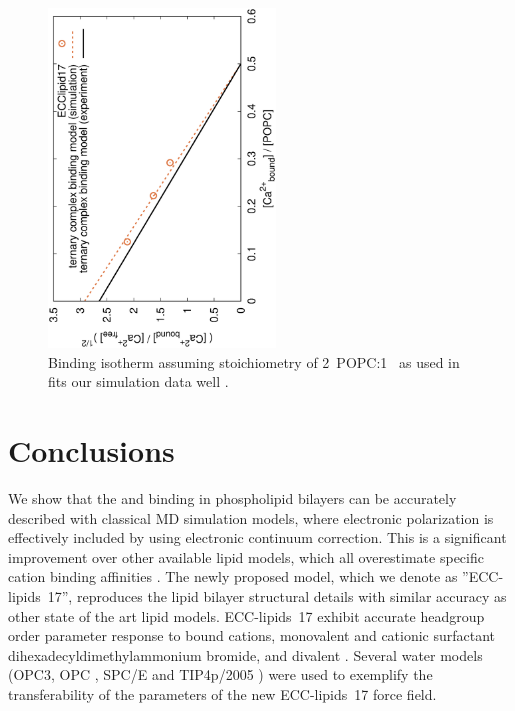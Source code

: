 \documentclass[aip,jcp,twocolumn]{revtex4}
\begin{document}
\begin{figure}[]
  \centering
  \includegraphics[height=9.0cm,angle=-90]{../Fig/bound-CAs_conc-eccl17.eps}
  \caption{\label{fig:cacl-bind}
    Binding isotherm assuming stoichiometry of 2~POPC:1~ as used in \cite{altenbach84} fits our simulation data well .}
\end{figure}




\section{Conclusions}
We show that the  and  binding in phospholipid bilayers can
be accurately described with classical MD simulation models, where electronic
polarization is effectively included by using electronic continuum correction.
This is a significant improvement over other available lipid models,
which all overestimate specific cation binding affinities \cite{catte16}.  
The newly proposed model, which we denote as ''ECC-lipids~17'', 
reproduces the lipid bilayer structural details
with similar accuracy as other state of the art lipid models.
ECC-lipids~17 exhibit accurate headgroup order parameter response to
bound cations, monovalent  and cationic surfactant dihexadecyldimethylammonium bromide, 
and divalent .
Several water models 
(OPC3\cite{Izadi16}, OPC \cite{Izadi14}, SPC/E \cite{Berendsen1987} and TIP4p/2005 \cite{Abascal2005}) 
were used to exemplify the transferability of 
the parameters of the new ECC-lipids~17 force field. 
\end{document}
